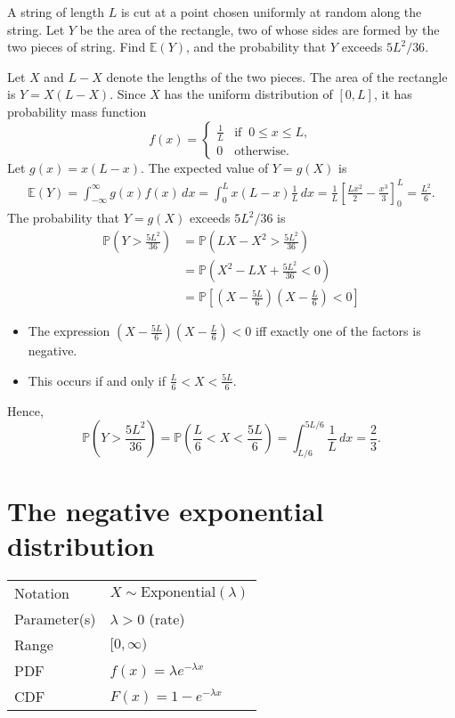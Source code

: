 \documentclass[lecture]{csm}
\newcommand{\prob}{\mathbb{P}}
\newcommand{\expe}{\mathbb{E}}
\def\it{\item}
\def\bit{\begin{itemize}}
\def\eit{\end{itemize}}
\begin{document}
\begin{example}
A string of length $L$ is cut at a point chosen uniformly at random along the string. Let $Y$ be the area of the rectangle, two of whose sides are formed by the two pieces of string. Find $\expe(Y)$, and the probability that $Y$ exceeds $5L^2/36$.
\end{example}
\begin{solution}
Let $X$ and $L-X$ denote the lengths of the two pieces. The area of the rectangle is $Y=X(L-X)$. Since $X$ has the uniform distribution of $[0,L]$, it has probability mass function
\[
f(x) = \begin{cases}
	\displaystyle\frac{1}{L}	& \text{if }\ 0\leq x\leq L, \\[2ex]
	0			& \text{otherwise}.	
\end{cases}
\]
Let $g(x)=x(L-x)$. The expected value of $Y=g(X)$ is
\begin{align*}
\expe(Y)
	= \int_{-\infty}^{\infty} g(x)f(x)\,dx 
	= \int_0^L x(L-x)\frac{1}{L}\,dx 
	= \frac{1}{L}\left[\frac{Lx^2}{2}-\frac{x^3}{3}\right]_0^L 
	= \frac{L^2}{6}.
\end{align*}
The probability that $Y=g(X)$ exceeds $5L^2/36$ is
\begin{align*}
\prob\left(Y>\frac{5L^2}{36}\right)	
	& = \prob\left(LX - X^2 > \frac{5L^2}{36}\right) \\
	& = \prob\left(X^2 - LX + \frac{5L^2}{36} < 0 \right) \\
	& = \prob\left[\left(X-\frac{5L}{6}\right)\left(X-\frac{L}{6}\right) < 0\right]
\end{align*}
\bit
\it The expression $\displaystyle\left(X-\frac{5L}{6}\right)\left(X-\frac{L}{6}\right) < 0$ iff exactly one of the factors is negative. 
\it This occurs if and only if $\displaystyle\frac{L}{6} < X < \frac{5L}{6}$.
\eit
Hence,
\[
\prob\left(Y>\frac{5L^2}{36}\right)
	= \prob\left(\frac{L}{6} < X < \frac{5L}{6}\right)
	= \int_{L/6}^{5L/6} \frac{1}{L}\,dx = \frac{2}{3}.
\]	
\end{solution}

\section{The negative exponential distribution}
\begin{center}
\begin{tabular}{ll}\hline
Notation			& $X\sim\text{Exponential}(\lambda)$ \\
Parameter(s)		& $\lambda>0$ \quad (rate) \\
Range			& $[0,\infty)$ \\
PDF				& $f(x) = \lambda e^{-\lambda x}$ \\
CDF				& $F(x) = 1 - e^{-\lambda x}$ \\ \hline
\end{tabular}
\end{center}
\end{document}

